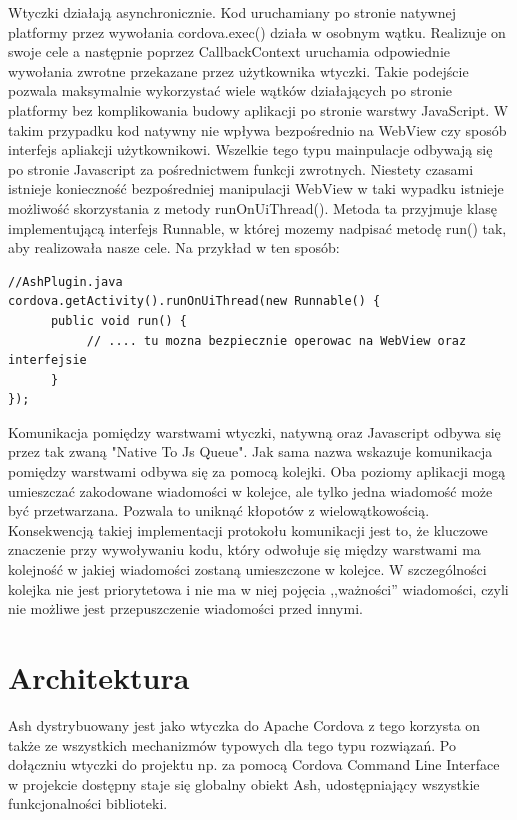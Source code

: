 \documentclass[brudnopis]{xmgr}
\begin{document}
Wtyczki działają asynchronicznie. Kod uruchamiany po stronie natywnej platformy przez wywołania cordova.exec() działa w osobnym wątku. Realizuje on swoje cele a następnie poprzez CallbackContext uruchamia odpowiednie wywołania zwrotne przekazane przez użytkownika wtyczki. Takie podejście pozwala maksymalnie wykorzystać wiele wątków działających po stronie platformy bez komplikowania budowy aplikacji po stronie warstwy  JavaScript. W takim przypadku kod natywny nie wpływa bezpośrednio na WebView czy sposób interfejs apliakcji użytkownikowi. Wszelkie tego typu mainpulacje odbywają się po stronie Javascript za pośrednictwem funkcji zwrotnych. Niestety czasami istnieje konieczność bezpośredniej manipulacji WebView w taki wypadku istnieje możliwość skorzystania z metody runOnUiThread(). Metoda ta przyjmuje klasę implementującą interfejs Runnable, w której mozemy nadpisać metodę run() tak, aby realizowała nasze cele. Na przykład w ten sposób:

\begin{lstlisting}
//AshPlugin.java
cordova.getActivity().runOnUiThread(new Runnable() {
      public void run() {
           // .... tu mozna bezpiecznie operowac na WebView oraz interfejsie
      }
});
\end{lstlisting}

Komunikacja pomiędzy warstwami wtyczki, natywną oraz Javascript odbywa się przez tak zwaną "Native To Js Queue". Jak sama nazwa wskazuje komunikacja pomiędzy warstwami odbywa się za pomocą kolejki. Oba poziomy aplikacji mogą umieszczać zakodowane wiadomości w kolejce, ale tylko jedna wiadomość może być przetwarzana. Pozwala to uniknąć kłopotów z wielowątkowością. Konsekwencją takiej implementacji protokołu komunikacji jest to, że kluczowe znaczenie przy wywoływaniu kodu, który odwołuje się między warstwami ma kolejność w jakiej wiadomości zostaną umieszczone w kolejce. W szczególności kolejka nie jest priorytetowa i nie ma w niej pojęcia ,,ważności'' wiadomości, czyli nie możliwe jest przepuszczenie wiadomości przed innymi.

\chapter{Architektura}

Ash dystrybuowany jest jako wtyczka do Apache Cordova z tego korzysta on także ze wszystkich mechanizmów typowych dla tego typu rozwiązań. Po dołączniu wtyczki do projektu np. za pomocą Cordova Command Line Interface w projekcie dostępny staje się globalny obiekt Ash, udostępniający wszystkie funkcjonalności biblioteki. 
\end{document}
